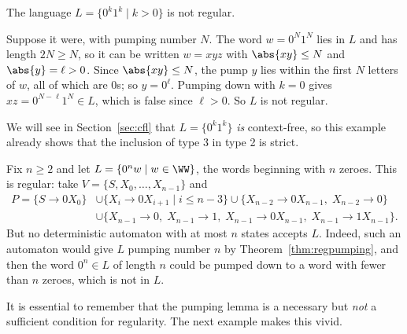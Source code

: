 \begin{example}\label{ex:0k1knotregular}
	The language $L = \{0^k1^k \mid k > 0\}$ is not regular.

	Suppose it were, with pumping number $N$. The word $w = 0^N1^N$ lies in $L$ and has length $2N \geq N$, so it can be written $w = xyz$ with $\abs{xy} \leq N$ and $\abs{y} = \ell > 0$. Since $\abs{xy} \leq N$, the pump $y$ lies within the first $N$ letters of $w$, all of which are $0$s; so $y = 0^\ell$. Pumping down with $k = 0$ gives $xz = 0^{N - \ell}1^N \in L$, which is false since $\ell > 0$. So $L$ is not regular.
\end{example}

We will see in Section~\ref{sec:cfl} that $L = \{0^k1^k\}$ \emph{is} context-free, so this example already shows that the inclusion of type 3 in type 2 is strict.

\begin{example}\label{ex:needstates}
	Fix $n \geq 2$ and let $L = \{0^n w \mid w \in \WW\}$, the words beginning with $n$ zeroes. This is regular: take $V = \{S, X_0, \dots, X_{n-1}\}$ and
	\begin{align*}
		P = \{S \to 0X_0\} &\cup \{X_i \to 0X_{i+1} \mid i \leq n - 3\} \cup \{X_{n-2} \to 0X_{n-1},\; X_{n-2} \to 0\} \\
		&\cup \{X_{n-1} \to 0,\; X_{n-1} \to 1,\; X_{n-1} \to 0X_{n-1},\; X_{n-1} \to 1X_{n-1}\}.
	\end{align*}
	But no deterministic automaton with at most $n$ states accepts $L$. Indeed, such an automaton would give $L$ pumping number $n$ by Theorem~\ref{thm:regpumping}, and then the word $0^n \in L$ of length $n$ could be pumped down to a word with fewer than $n$ zeroes, which is not in $L$.
\end{example}

It is essential to remember that the pumping lemma is a necessary but \emph{not} a sufficient condition for regularity. The next example makes this vivid.

